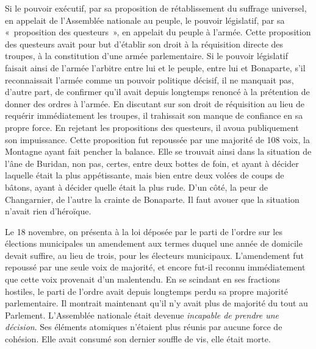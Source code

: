 \documentclass[french,twoside]{book} %
\begin{document}
Si le pouvoir exécutif, par sa proposition de rétablissement du suffrage universel, en appelait de l’Assemblée nationale au peuple, le pouvoir législatif, par sa « proposition des questeurs », en appelait du peuple à l’armée. Cette proposition des questeurs avait pour but d’établir son droit à la réquisition directe des troupes, à la constitution d’une armée parlementaire. Si le pouvoir législatif faisait ainsi de l’armée l’arbitre entre lui et le peuple, entre lui et Bonaparte, s’il reconnaissait l’armée comme un pouvoir politique décisif, il ne manquait pas, d’autre part, de confirmer qu’il avait depuis longtemps renoncé à la prétention de donner des ordres à l’armée. En discutant sur son droit de réquisition au lieu de requérir immédiatement les troupes, il trahissait son manque de confiance en sa propre force. En rejetant les propositions des questeurs, il avoua publiquement son impuissance. Cette proposition fut repoussée par une majorité de 108 voix, la Montagne ayant fait pencher la balance. Elle se trouvait ainsi dans la situation de l’âne de Buridan, non pas, certes, entre deux bottes de foin, et ayant à décider laquelle était la plus appétissante, mais bien entre deux volées de coups de bâtons, ayant à décider quelle était la plus rude. D’un côté, la peur de Changarnier, de l’autre la crainte de Bonaparte. Il faut avouer que la situation n’avait rien d’héroïque.\par
Le 18 novembre, on présenta à la loi déposée par le parti de l’ordre sur les élections municipales un amendement aux termes duquel une année de domicile devait suffire, au lieu de trois, pour les électeurs municipaux. L’amendement fut repoussé par une seule voix de majorité, et encore fut-il reconnu immédiatement que cette voix provenait d’un malentendu. En se scindant en ses fractions hostiles, le parti de l’ordre avait depuis longtemps perdu sa propre majorité parlementaire. Il montrait maintenant qu’il n’y avait plus de majorité du tout au Parlement. L’Assemblée nationale était devenue \emph{incapable de prendre une décision}. Ses éléments atomiques n’étaient plus réunis par aucune force de cohésion. Elle avait consumé son dernier souffle de vis, elle était morte.\par
\end{document}
